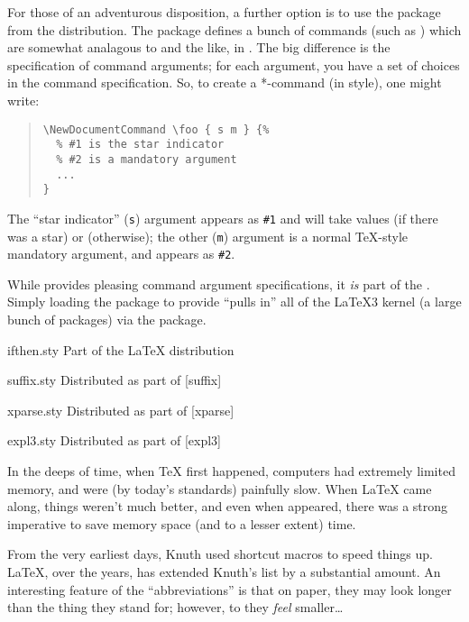 For those of an adventurous disposition, a further option is to use
the  package from the 
distribution.  The package defines a bunch of commands (such as
) which are somewhat analagous to
 and the like, in \LaTeXe{}.  The big difference is
the specification of command arguments; for each argument, you have a
set of choices in the command specification.  So, to create a
*-command (in \LaTeXe{} style), one might write:
\begin{quote}
\begin{verbatim}
\NewDocumentCommand \foo { s m } {%
  % #1 is the star indicator
  % #2 is a mandatory argument
  ...
}
\end{verbatim}
\end{quote}
The ``star indicator'' (\texttt{s}) argument appears as \texttt{\#1}
and will take values  (if there was a star) or
 (otherwise); the other (\texttt{m}) argument  is a
normal \TeX{}-style mandatory argument, and appears as \texttt{\#2}.

While  provides pleasing command argument
specifications, it \emph{is} part of the %
.
Simply loading the package to provide 
``pulls in'' all of the \LaTeX{}3 kernel (a large bunch of packages)
via the  package.
\begin{ctanrefs}
\item[ifthen.sty]Part of the \LaTeX{} distribution
\item[suffix.sty]Distributed as part of [suffix]
\item[xparse.sty]Distributed as part of [xparse]
\item[expl3.sty]Distributed as part of [expl3]
\end{ctanrefs}


In the deeps of time, when \TeX{} first happened, computers had
extremely limited memory, and were (by today's standards) painfully
slow.  When \LaTeX{} came along, things weren't much better, and even
when \LaTeXe{} appeared, there was a strong imperative to save memory
space (and to a lesser extent)  time.

From the very earliest days, Knuth used shortcut macros to speed
things up.  \LaTeX{}, over the years, has extended Knuth's list by a
substantial amount.  An interesting feature  of the ``abbreviations'' is
that on paper, they may look longer than the thing they stand for;
however, to \AllTeX{} they \emph{feel} smaller\dots{}

